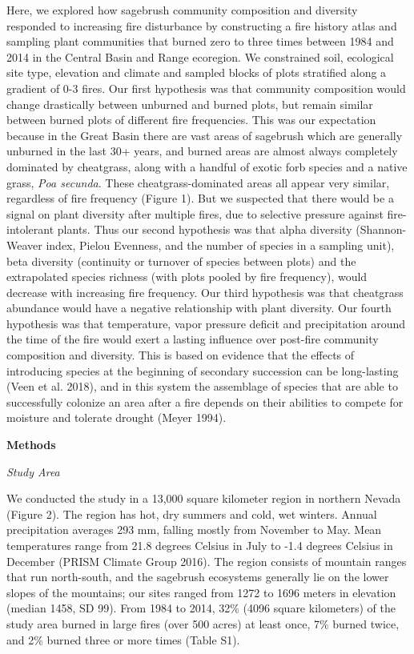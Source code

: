 \documentclass[12pt,]{article}
\begin{document}
Here, we explored how sagebrush community composition and diversity
responded to increasing fire disturbance by constructing a fire history
atlas and sampling plant communities that burned zero to three times
between 1984 and 2014 in the Central Basin and Range ecoregion. We
constrained soil, ecological site type, elevation and climate and
sampled blocks of plots stratified along a gradient of 0-3 fires. Our
first hypothesis was that community composition would change drastically
between unburned and burned plots, but remain similar between burned
plots of different fire frequencies. This was our expectation because in
the Great Basin there are vast areas of sagebrush which are generally
unburned in the last 30+ years, and burned areas are almost always
completely dominated by cheatgrass, along with a handful of exotic forb
species and a native grass, \emph{Poa secunda}. These
cheatgrass-dominated areas all appear very similar, regardless of fire
frequency (Figure 1). But we suspected that there would be a signal on
plant diversity after multiple fires, due to selective pressure against
fire-intolerant plants. Thus our second hypothesis was that alpha
diversity (Shannon-Weaver index, Pielou Evenness, and the number of
species in a sampling unit), beta diversity (continuity or turnover of
species between plots) and the extrapolated species richness (with plots
pooled by fire frequency), would decrease with increasing fire
frequency. Our third hypothesis was that cheatgrass abundance would have
a negative relationship with plant diversity. Our fourth hypothesis was
that temperature, vapor pressure deficit and precipitation around the
time of the fire would exert a lasting influence over post-fire
community composition and diversity. This is based on evidence that the
effects of introducing species at the beginning of secondary succession
can be long-lasting (Veen et al. 2018), and in this system the
assemblage of species that are able to successfully colonize an area
after a fire depends on their abilities to compete for moisture and
tolerate drought (Meyer 1994).

\textbf{Methods}

\emph{Study Area}

We conducted the study in a 13,000 square kilometer region in northern
Nevada (Figure 2). The region has hot, dry summers and cold, wet
winters. Annual precipitation averages 293 mm, falling mostly from
November to May. Mean temperatures range from 21.8 degrees Celsius in
July to -1.4 degrees Celsius in December (PRISM Climate Group 2016). The
region consists of mountain ranges that run north-south, and the
sagebrush ecosystems generally lie on the lower slopes of the mountains;
our sites ranged from 1272 to 1696 meters in elevation (median 1458, SD
99). From 1984 to 2014, 32\% (4096 square kilometers) of the study area
burned in large fires (over 500 acres) at least once, 7\% burned twice,
and 2\% burned three or more times (Table S1).
\end{document}
